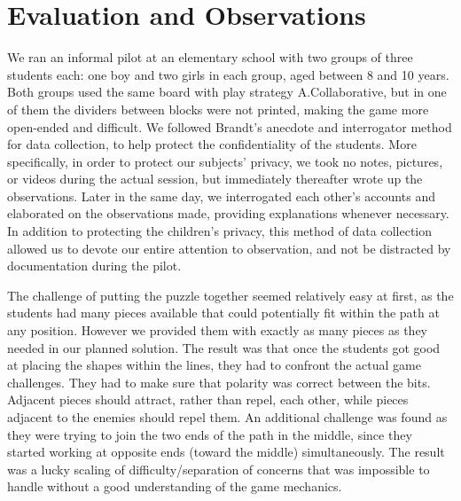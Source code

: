 \documentclass{acm_proc_article-sp}
\begin{document}
\section{Evaluation and Observations}
\label{sec:observations}

We ran an informal pilot at an elementary school with two groups of three students each: one boy and two girls in each group, aged between 8 and 10 years. 
Both groups used the same board with play strategy A.Collaborative, but in one of them the dividers between blocks were not printed, making the game more open-ended and difficult. 
We followed Brandt's anecdote and interrogator method \cite{brandt1972studying} for data collection, to help protect the confidentiality of the students. More specifically, in order to protect our subjects' privacy, we took no notes, pictures, or videos during the actual session, but immediately thereafter wrote up the observations. 
Later in the same day, we interrogated each other's accounts and elaborated on the observations made, providing explanations whenever necessary. 
In addition to protecting the children's privacy, this method of data collection allowed us to devote our entire attention to observation, and not be distracted by documentation during the pilot.

The challenge of putting the puzzle together seemed relatively easy at first, as the students had many pieces available that could potentially fit within the path at any position. 
However we provided them with exactly as many pieces as they needed in our planned solution. 
The result was that once the students got good at placing the shapes within the lines, they had to confront the actual game challenges. 
They had to make sure that polarity was correct between the bits. Adjacent pieces should attract, rather than repel, each other, while pieces adjacent to the enemies should repel them. An additional challenge was found as they were trying to join the two ends of the path in the middle, since they started working at opposite ends (toward the middle) simultaneously. 
The result was a lucky scaling of difficulty/separation of concerns that was impossible to handle without a good understanding of the game mechanics.
\end{document}
